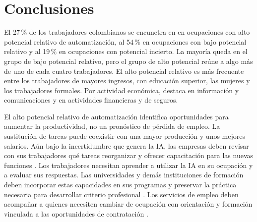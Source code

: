 \documentclass[12pt, a4paper]{article}
\begin{document}
\clearpage
\section{Conclusiones}
\label{sec:conclusiones}

El 27\,\% de los trabajadores colombianos se encunetra en en ocupaciones con alto potencial relativo de automatización, al 54\,\% en ocupaciones con bajo potencial relativo y al 19\,\% en ocupaciones con potencial incierto. La mayoría queda en el grupo de bajo potencial relativo, pero el grupo de alto potencial reúne a algo más de uno de cada cuatro trabajadores. El alto potencial relativo es más frecuente entre los trabajadores de mayores ingresos, con educación superior, las mujeres y los trabajadores formales. Por actividad económica, destaca en información y comunicaciones y en actividades financieras y de seguros. 

El alto potencial relativo de automatización identifica oportunidades para aumentar la productividad, no un pronóstico de pérdida de empleo. La sustitución de tareas puede coexistir con una mayor producción y unos mejores salarios. Aún bajo la incertidumbre que genera la IA, las empresas deben revisar con sus trabajadores qué tareas reorganizar y ofrecer capacitación para las nuevas funciones \citep{ocde2024}. Los trabajadores necesitan aprender a utilizar la IA en su ocupación y a evaluar sus respuestas. Las universidades y demás instituciones de formación deben incorporar estas capacidades en sus programas y preservar la práctica necesaria para desarrollar criterio profesional \citep{autor2026}. Los servicios de empleo deben acompañar a quienes necesiten cambiar de ocupación con orientación y formación vinculada a las oportunidades de contratación \citep{ocde2024}.
\end{document}
